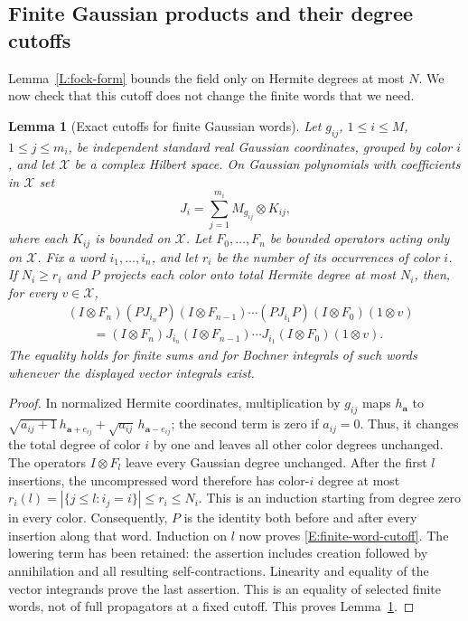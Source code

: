 \documentclass[12pt,oneside,openany]{book}
\makeatletter
\let\lean@pending\@empty
\newcommand{\LeanMarker}[1]{\gdef\lean@pending{#1}}
\numberwithin{equation}{section}
\newtheorem{lemma}[theorem]{Lemma}
\theoremstyle{nogostyle}
\theoremstyle{definition}
\makeatother
\begin{document}
\subsection{Finite Gaussian products and their degree cutoffs}

Lemma~\ref{L:fock-form} bounds the field only on Hermite degrees at most $N$.
We now check that this cutoff does not change the finite words that we need.

\LeanMarker{L:finite-word-cutoff}
\begin{lemma}[Exact cutoffs for finite Gaussian words]\label{L:finite-word-cutoff}
  Let $g_{ij}$, $1 \le i \le M$, $1 \le j \le m_i$, be independent standard real
  Gaussian coordinates, grouped by color $i$, and let $\mathscr{X}$ be a complex
  Hilbert space. On Gaussian polynomials with coefficients in $\mathscr{X}$ set
  \[
    J_i=\sum_{j=1}^{m_i}M_{g_{ij}}\otimes K_{ij},
  \]
  where each $K_{ij}$ is bounded on $\mathscr{X}$. Let $F_0,\ldots,F_n$ be
  bounded operators acting only on $\mathscr{X}$. Fix a word $i_1,\ldots,i_n$,
  and let $r_i$ be the number of its occurrences of color $i$. If $N_i \ge r_i$
  and $P$ projects each color onto total Hermite degree at most $N_i$, then, for
  every $v \in \mathscr{X}$,
  \begin{equation}\label{E:finite-word-cutoff}
    \begin{split}
      &(I\otimes F_n)(PJ_{i_n}P)(I\otimes F_{n-1})\cdots
      (PJ_{i_1}P)(I\otimes F_0)(1\otimes v)\\
      &\qquad=(I\otimes F_n)J_{i_n}(I\otimes F_{n-1})\cdots
      J_{i_1}(I\otimes F_0)(1\otimes v).
    \end{split}
  \end{equation}
  The equality holds for finite sums and for Bochner integrals of such words
  whenever the displayed vector integrals exist.
\end{lemma}

\begin{proof}
  In normalized Hermite coordinates, multiplication by $g_{ij}$ maps
  $h_{\boldsymbol a}$ to $\sqrt{a_{ij}+1}\,h_{\boldsymbol a+e_{ij}}
  +\sqrt{a_{ij}}\,h_{\boldsymbol a-e_{ij}}$; the second term is zero if $a_{ij}
  = 0$. Thus, it changes the total degree of color $i$ by one and leaves all
  other color degrees unchanged. The operators $I\otimes F_l$ leave every
  Gaussian degree unchanged. After the first $l$ insertions, the uncompressed
  word therefore has color-$i$ degree at most $r_i(l) = |\{j\le l:i_j=i\}| \le
  r_i \le N_i$. This is an induction starting from degree zero in every color.
  Consequently, $P$ is the identity both before and after every insertion along
  that word. Induction on $l$ now proves \eqref{E:finite-word-cutoff}. The
  lowering term has been retained: the assertion includes creation followed by
  annihilation and all resulting self-contractions. Linearity and equality of
  the vector integrands prove the last assertion. This is an equality of
  selected finite words, not of full propagators at a fixed cutoff. This proves
  Lemma~\ref{L:finite-word-cutoff}.
\end{proof}
\end{document}
